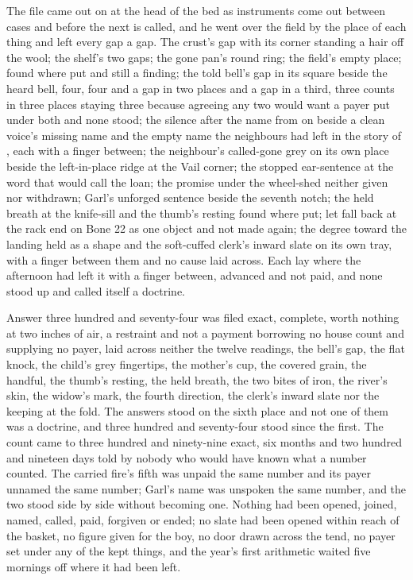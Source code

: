 The file came out on  at the head of the bed as instruments come out between cases and before the next is called, and he went over the field by the place of each thing and left every gap a gap. The crust's gap with its corner standing a hair off the wool; the shelf's two gaps; the gone pan's round ring; the field's empty place;  found where put and still a finding; the told bell's gap in its square beside the heard bell, four, four and a gap in two places and a gap in a third, three counts in three places staying three because agreeing any two would want a payer put under both and none stood; the silence after the name from  on  beside a clean voice's missing name and the empty name the neighbours had left in the story of , each with a finger between; the neighbour's called-gone grey on its own place beside the left-in-place ridge at the Vail corner; the stopped ear-sentence at the word that would call the loan; the promise under the wheel-shed neither given nor withdrawn; Garl's unforged sentence beside the seventh notch; the held breath at the knife-sill and the thumb's resting found where put;  let fall back at the rack end on Bone 22 as one object and not made again; the degree toward the landing held as a shape and the soft-cuffed clerk's inward slate on its own tray, with a finger between them and no cause laid across. Each lay where the afternoon had left it with a finger between, advanced and not paid, and none stood up and called itself a doctrine.

Answer three hundred and seventy-four was filed exact, complete, worth nothing at two inches of air, a restraint and not a payment borrowing no house count and supplying no payer, laid across neither the twelve readings, the bell's gap, the flat knock, the child's grey fingertips, the mother's cup, the covered grain, the handful, the thumb's resting, the held breath, the two bites of iron, the river's skin, the widow's mark, the fourth direction, the clerk's inward slate nor the keeping at the fold. The answers stood on the sixth place and not one of them was a doctrine, and three hundred and seventy-four stood since the first. The count came to three hundred and ninety-nine exact, six months and two hundred and nineteen days told by nobody who would have known what a number counted. The carried fire's fifth was unpaid the same number and its payer unnamed the same number; Garl's name was unspoken the same number, and the two stood side by side without becoming one. Nothing had been opened, joined, named, called, paid, forgiven or ended; no slate had been opened within reach of the basket, no figure given for the boy, no door drawn across the tend, no payer set under any of the kept things, and the year's first arithmetic waited five mornings off where it had been left.

